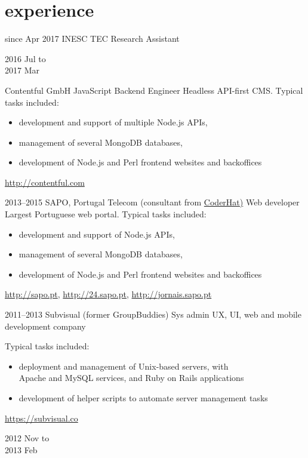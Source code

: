\documentclass[a4paper]{friggeri-cv}
\begin{document}
\section{experience}
\begin{entrylist}
  \entry
    {{\tiny since} Apr 2017}
    {INESC TEC}
    {Research Assistant}
    {\vspace{-0.7cm}}
    {}
  \entry
    {\parbox[t][][t]{1.8cm}{2016 {\footnotesize Jul to}\\2017 {\footnotesize Mar}}}
    {Contentful GmbH}
    {JavaScript Backend Engineer}
    {Headless API-first CMS. \footnotesize{Typical tasks
    included:}}
    {\begin{itemize}
        \item development and support of multiple Node.js APIs,
        \item management of several MongoDB databases,
        \item development of Node.js and Perl frontend websites and backoffices
    \end{itemize}
    \url{http://contentful.com}
    }
  \entry
    {2013--2015}
    {SAPO, Portugal Telecom (consultant from \href{http://www.coderhat.com/}{CoderHat)}}
    {Web developer}
    {Largest Portuguese web portal. \footnotesize{Typical tasks
    included:}}
    {\begin{itemize}
        \item development and support of Node.js APIs,
        \item management of several MongoDB databases,
        \item development of Node.js and Perl frontend websites and backoffices
    \end{itemize}
    \url{http://sapo.pt}, \url{http://24.sapo.pt}, \url{http://jornais.sapo.pt}
    }
  \entry
    {2011--2013}
    {Subvisual (former GroupBuddies)}
    {Sys admin}
    {UX, UI, web and mobile development company}
    {Typical tasks included:
        \begin{itemize}
            \item deployment and management of Unix-based
            servers, with\\
            Apache and MySQL services, and Ruby on Rails applications
            \item development of helper scripts to automate
            server management tasks
            \end{itemize}
        \url{https://subvisual.co}
    }
  \entry
    {\parbox[t][][t]{1.8cm}{2012 {\footnotesize Nov to}\\2013 {\footnotesize Feb}}}

\end{entrylist}
\end{document}
